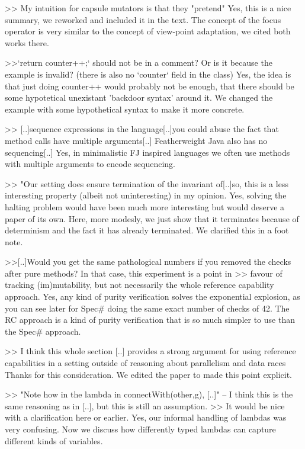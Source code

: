 >> My intuition for capsule mutators is that they "pretend"
Yes, this is a nice summary, we reworked and included it in the text. 
The concept of the focus operator is very similar to the concept of view-point adaptation, we cited both works there.


>>`return counter++;` should not be in a comment? Or is it because the example is invalid? (there is also no `counter` field in the class)
Yes, the idea is that just doing counter++ would probably not be enough, that there should be some hypotetical unexistant 'backdoor syntax' around it.
We changed the example with some hypothetical syntax to make it more concrete.

>> [..]sequence expressions in the language[..]you could abuse the fact that method calls have multiple arguments[..]  Featherweight Java also has no sequencing[..]
Yes, in minimalistic FJ inspired languages we often use methods with multiple arguments to encode sequencing.


>> "Our setting does ensure termination of the invariant of[..]so, this is a less  interesting property (albeit not uninteresting) in my opinion.
Yes, solving the halting problem would have been much more interesting but would deserve a paper of its own.
Here, more modesly, we just show that it terminates because of determinism and the fact it has already terminated.
We clarified this in a foot note.


>>[..]Would you get the same pathological numbers if you removed the checks after pure methods? In that case, this experiment is a point in
>> favour of tracking (im)mutability, but not necessarily the whole reference capability approach.
Yes, any kind of purity verification solves the exponential explosion, as you can see later for Spec# doing the same exact number of checks of 42.
The RC approach is a kind of purity verification that is so much simpler to use than the Spec# approach.

>> I think this whole section [..] provides a strong argument for using reference capabilities in a setting outside of reasoning about parallelism and data races
Thanks for this consideration. We edited the paper to made this point explicit.


>> "Note how in the lambda in connectWith(other,g), [..]" -- I think this is the same reasoning as in [..], but this is still an assumption.
>> It would be nice with a clarification here or earlier.
Yes, our informal handling of lambdas was very confusing. Now we discuss how differently typed lambdas can capture different kinds of variables.


